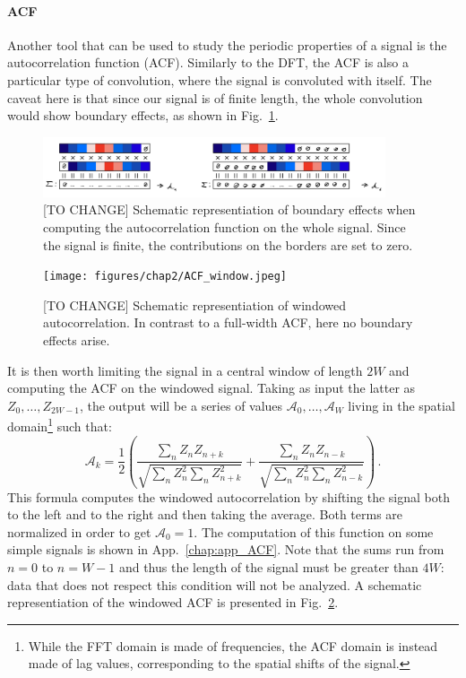 \paragraph{ACF}
Another tool that can be used to study the periodic properties of a signal is the autocorrelation function (ACF). Similarly to the DFT, the ACF is also a particular type of convolution, where the signal is convoluted with itself. The caveat here is that since our signal is of finite length, the whole convolution would show boundary effects, as shown in Fig.\ \ref{fig:ACF_bound}.
\begin{figure}[h!]
    \centering
    \includegraphics[width=0.9\textwidth]{figures/chap2/ACF_bound.jpeg}
    \caption{[TO CHANGE] Schematic representiation of boundary effects when computing the autocorrelation function on the whole signal. Since the signal is finite, the contributions on the borders are set to zero.}
    \label{fig:ACF_bound}
\end{figure}
\begin{figure}[h!]
    \centering
    \texttt{[image: figures/chap2/ACF\_window.jpeg]}
    \caption{[TO CHANGE] Schematic representiation of windowed autocorrelation. In contrast to a full-width ACF, here no boundary effects arise.}
    \label{fig:ACF_window}
\end{figure}
It is then worth limiting the signal in a central window of length $2W$ and computing the ACF on the windowed signal. Taking as input the latter as $Z_0,\dots,Z_{2W-1}$, the output will be a series of values $\mathcal{A}_0,\dots,\mathcal{A}_{W}$ living in the spatial domain\footnote{While the FFT domain is made of frequencies, the ACF domain is instead made of lag values, corresponding to the spatial shifts of the signal.} such that:
\begin{equation*}
    \mathcal{A}_k = \frac{1}{2} \left( \frac{\sum_{n} Z_n Z_{n+k}}{\sqrt{\sum_{n} Z_n^2 \sum_{n} Z_{n+k}^2}} + \frac{\sum_{n} Z_n Z_{n-k}}{\sqrt{\sum_{n} Z_n^2 \sum_{n} Z_{n-k}^2}} \right)\, .
\end{equation*}
This formula computes the windowed autocorrelation by shifting the signal both to the left and to the right and then taking the average.
Both terms are normalized in order to get $\mathcal{A}_0 = 1$. The computation of this function on some simple signals is shown in App.\ \ref{chap:app_ACF}. Note that the sums run from $n = 0$ to $n = W-1$ and thus the length of the signal must be greater than $4W$: data that does not respect this condition will not be analyzed. A schematic representiation of the windowed ACF is presented in Fig.\ \ref{fig:ACF_window}.

